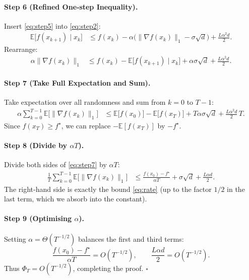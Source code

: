 \documentclass[11pt]{article}
\newcommand{\E}{\mathbb{E}}
\begin{document}
\paragraph{Step 6 (Refined One‑step Inequality).}
Insert \eqref{eq:step5} into \eqref{eq:step2}:
\begin{align}
\E\!\bigl[f(x_{k+1})\mid x_k\bigr]
&\le f(x_k)-\alpha\bigl(\|\nabla f(x_k)\|_{1}-\sigma\sqrt{d}\bigr)
   +\frac{L\alpha^{2}d}{2}.
\label{eq:step6}
\end{align}
Rearrange:
\begin{align}
\alpha\|\nabla f(x_k)\|_{1}
&\le f(x_k)-\E\!\bigl[f(x_{k+1})\mid x_k\bigr]
   +\alpha\sigma\sqrt{d}
   +\frac{L\alpha^{2}d}{2}.
\label{eq:step6b}
\end{align}

\paragraph{Step 7 (Take Full Expectation and Sum).}
Take expectation over all randomness and sum from $k=0$ to $T-1$:
\begin{align}
\alpha\sum_{k=0}^{T-1}\E\!\bigl[\|\nabla f(x_k)\|_{1}\bigr]
&\le \E\!\bigl[f(x_0)\bigr]-\E\!\bigl[f(x_T)\bigr]
   +T\alpha\sigma\sqrt{d}
   +\frac{L\alpha^{2}d}{2}\,T .
\label{eq:step7}
\end{align}
Since $f(x_T)\ge f^\star$, we can replace $-\E[f(x_T)]$ by $-f^\star$.

\paragraph{Step 8 (Divide by $\alpha T$).}
Divide both sides of \eqref{eq:step7} by $\alpha T$:
\begin{align}
\frac{1}{T}\sum_{k=0}^{T-1}\E\!\bigl[\|\nabla f(x_k)\|_{1}\bigr]
&\le \frac{f(x_0)-f^\star}{\alpha T}
   +\sigma\sqrt{d}
   +\frac{L\alpha d}{2}.
\label{eq:step8}
\end{align}
The right‑hand side is exactly the bound \eqref{eq:rate} (up to the factor $1/2$ in the last term, which we absorb into the constant).

\paragraph{Step 9 (Optimising $\alpha$).}
Setting $\alpha = \Theta(T^{-1/2})$ balances the first and third terms:
\[
\frac{f(x_0)-f^\star}{\alpha T}=O(T^{-1/2}),\qquad
\frac{L\alpha d}{2}=O(T^{-1/2}).
\]
Thus $\Phi_T=O(T^{-1/2})$, completing the proof. \hfill $\square$
\end{document}
